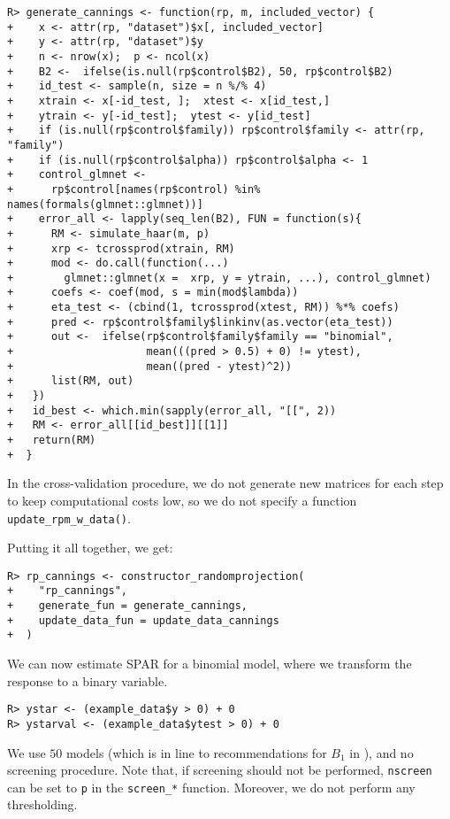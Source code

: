 \documentclass[
  article,
  nojss]{jss}
\begin{document}
\begin{verbatim}
R> generate_cannings <- function(rp, m, included_vector) {
+    x <- attr(rp, "dataset")$x[, included_vector]
+    y <- attr(rp, "dataset")$y
+    n <- nrow(x);  p <- ncol(x)
+    B2 <-  ifelse(is.null(rp$control$B2), 50, rp$control$B2)
+    id_test <- sample(n, size = n %/% 4)
+    xtrain <- x[-id_test, ];  xtest <- x[id_test,]
+    ytrain <- y[-id_test];  ytest <- y[id_test]
+    if (is.null(rp$control$family)) rp$control$family <- attr(rp, "family")
+    if (is.null(rp$control$alpha)) rp$control$alpha <- 1
+    control_glmnet <-
+      rp$control[names(rp$control) %in% names(formals(glmnet::glmnet))]
+    error_all <- lapply(seq_len(B2), FUN = function(s){
+      RM <- simulate_haar(m, p)
+      xrp <- tcrossprod(xtrain, RM)
+      mod <- do.call(function(...) 
+        glmnet::glmnet(x =  xrp, y = ytrain, ...), control_glmnet)
+      coefs <- coef(mod, s = min(mod$lambda))
+      eta_test <- (cbind(1, tcrossprod(xtest, RM)) %*% coefs)
+      pred <- rp$control$family$linkinv(as.vector(eta_test))
+      out <-  ifelse(rp$control$family$family == "binomial",
+                     mean(((pred > 0.5) + 0) != ytest), 
+                     mean((pred - ytest)^2))
+      list(RM, out)
+   })
+   id_best <- which.min(sapply(error_all, "[[", 2))
+   RM <- error_all[[id_best]][[1]]
+   return(RM)
+  }
\end{verbatim}

In the cross-validation procedure, we do not generate new matrices for
each step to keep computational costs low, so we do not specify a
function \texttt{update\_rpm\_w\_data()}.

Putting it all together, we get:

\begin{verbatim}
R> rp_cannings <- constructor_randomprojection(
+    "rp_cannings",
+    generate_fun = generate_cannings,
+    update_data_fun = update_data_cannings
+  )
\end{verbatim}

We can now estimate SPAR for a binomial model, where we transform the
response to a binary variable.

\begin{verbatim}
R> ystar <- (example_data$y > 0) + 0
R> ystarval <- (example_data$ytest > 0) + 0
\end{verbatim}

We use \(50\) models (which is in line to recommendations for \(B_1\) in
\citet{cannings2017random}), and no screening procedure. Note that, if
screening should not be performed, \texttt{nscreen} can be set to
\texttt{p} in the \texttt{screen\_*} function. Moreover, we do not
perform any thresholding.
\end{document}
